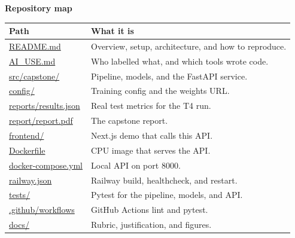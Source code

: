 \documentclass[9pt,a4paper]{extarticle}
\begin{document}
\vspace{0.35em}
{\small\bfseries Repository map}\\[-0.15em]
{\scriptsize
\setlength{\tabcolsep}{3pt}
\begin{tabular}{@{}l p{12.8cm}@{}}
\toprule
Path & What it is \\
\midrule
\href{https://github.com/ChristopherKiokoStrathmore/-DSA8401---ML-CAPSTONE-PROJECT-/blob/main/README.md}{README.md} & Overview, setup, architecture, and how to reproduce. \\
\href{https://github.com/ChristopherKiokoStrathmore/-DSA8401---ML-CAPSTONE-PROJECT-/blob/main/AI_USE.md}{AI\_USE.md} & Who labelled what, and which tools wrote code. \\
\href{https://github.com/ChristopherKiokoStrathmore/-DSA8401---ML-CAPSTONE-PROJECT-/tree/main/src/capstone}{src/capstone/} & Pipeline, models, and the FastAPI service. \\
\href{https://github.com/ChristopherKiokoStrathmore/-DSA8401---ML-CAPSTONE-PROJECT-/tree/main/config}{config/} & Training config and the weights URL. \\
\href{https://github.com/ChristopherKiokoStrathmore/-DSA8401---ML-CAPSTONE-PROJECT-/blob/main/reports/results.json}{reports/results.json} & Real test metrics for the T4 run. \\
\href{https://github.com/ChristopherKiokoStrathmore/-DSA8401---ML-CAPSTONE-PROJECT-/blob/main/report/report.pdf}{report/report.pdf} & The capstone report. \\
\href{https://github.com/ChristopherKiokoStrathmore/-DSA8401---ML-CAPSTONE-PROJECT-/tree/main/frontend}{frontend/} & Next.js demo that calls this API. \\
\href{https://github.com/ChristopherKiokoStrathmore/-DSA8401---ML-CAPSTONE-PROJECT-/blob/main/Dockerfile}{Dockerfile} & CPU image that serves the API. \\
\href{https://github.com/ChristopherKiokoStrathmore/-DSA8401---ML-CAPSTONE-PROJECT-/blob/main/docker-compose.yml}{docker-compose.yml} & Local API on port 8000. \\
\href{https://github.com/ChristopherKiokoStrathmore/-DSA8401---ML-CAPSTONE-PROJECT-/blob/main/railway.json}{railway.json} & Railway build, healthcheck, and restart. \\
\href{https://github.com/ChristopherKiokoStrathmore/-DSA8401---ML-CAPSTONE-PROJECT-/tree/main/tests}{tests/} & Pytest for the pipeline, models, and API. \\
\href{https://github.com/ChristopherKiokoStrathmore/-DSA8401---ML-CAPSTONE-PROJECT-/tree/main/.github/workflows}{.github/workflows} & GitHub Actions lint and pytest. \\
\href{https://github.com/ChristopherKiokoStrathmore/-DSA8401---ML-CAPSTONE-PROJECT-/tree/main/docs}{docs/} & Rubric, justification, and figures. \\
\bottomrule
\end{tabular}
}
\end{document}
